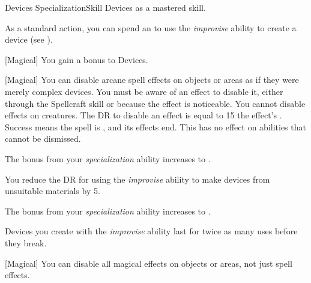     \begin{feat}{Devices Specialization}{Skill}
        \featpre Devices as a mastered skill.

         As a standard action, you can spend an  to use the \textit{improvise} ability to create a device (see ).

        [Magical] You gain a  bonus to Devices.

        [Magical] You can disable arcane spell effects on objects or areas as if they were merely complex devices.
        You must be aware of an effect to disable it, either through the Spellcraft skill or because the effect is noticeable.
        You cannot disable effects on creatures.
        The DR to disable an effect is equal to 15 \add the effect's .
        Success means the spell is , and its effects end.
        This has no effect on abilities that cannot be dismissed.

         The bonus from your \textit{specialization} ability increases to .

         You reduce the DR for using the \textit{improvise} ability to make devices from unsuitable materials by 5.

         The bonus from your \textit{specialization} ability increases to .

         Devices you create with the \textit{improvise} ability last for twice as many uses before they break.

        [Magical] You can disable all magical effects on objects or areas, not just spell effects.
    \end{feat}

